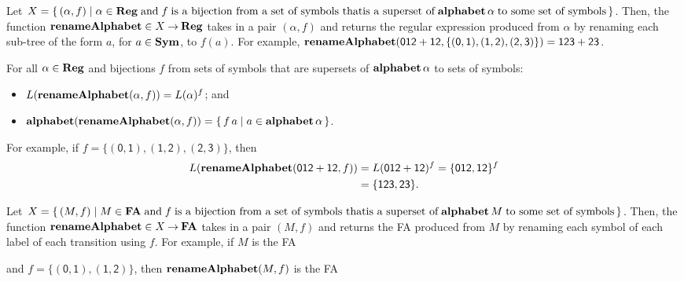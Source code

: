 Let $X=\{ \, (\alpha,f) \mid \alpha\in\mathbf{Reg}\;\allowbreak\mbox{and}\allowbreak\;f\;\allowbreak\mbox{is a
bijection from a set of symbols that}\allowbreak\allowbreak\mbox{is a superset
of}\allowbreak\;\mathbf{alphabet}\,\alpha\;\allowbreak\mbox{to some set of symbols}\allowbreak \, \}$.
Then, the function $\mathbf{renameAlphabet}\in X\mathbin{\to}\mathbf{Reg}$ takes in a pair
$(\alpha,f)$ and
%
%
%
%
returns the regular expression produced from $\alpha$ by renaming each
sub-tree of the form $a$, for $a\in\mathbf{Sym}$, to $f(a)$.
For example, $\mathbf{renameAlphabet}(\mathsf{012+12},
\mathsf{\{(0, 1), (1, 2), (2, 3)\}}) =
\mathsf{123+23}$.

\begin{theorem}
For all $\alpha\in\mathbf{Reg}$ and bijections $f$ from sets of symbols that
are supersets of $\mathbf{alphabet}\,\alpha$ to sets of symbols:
\begin{itemize}
\item $L(\mathbf{renameAlphabet}(\alpha,f)) = L(\alpha)^f$; and

\item $\mathbf{alphabet}(\mathbf{renameAlphabet}(\alpha,f)) =
\{ \, f\,a \mid a\in\mathbf{alphabet}\,\alpha \, \}$.
\end{itemize}
\end{theorem}

For example, if $f=\mathsf{\{(0, 1), (1, 2), (2, 3)\}}$, then
\begin{align*}
L(\mathbf{renameAlphabet}(\mathsf{012+12}, f)) &=
L(\mathsf{012+12})^f=\{\mathsf{012,12}\}^f \\
&= \{\mathsf{123,23}\} .
\end{align*}

Let $X=\{ \, (M,f) \mid M\in\mathbf{FA}\;\allowbreak\mbox{and}\allowbreak\;f\;\allowbreak\mbox{is a
bijection from a set of symbols that}\allowbreak\allowbreak\mbox{is a superset
of}\allowbreak\;\mathbf{alphabet}\,M\;\allowbreak\mbox{to some set of symbols}\allowbreak \, \}$.
Then, the function $\mathbf{renameAlphabet}\in X\mathbin{\to}\mathbf{FA}$ takes in a pair $(M,f)$ and
%
%
%
%
%
%
%
%
%
%
returns the FA produced from $M$ by renaming each symbol of each
label of each transition using $f$.
For example, if $M$ is the FA
\begin{center}

\end{center}
and $f=\{\mathsf{(0,1), (1,2)}\}$, then
$\mathbf{renameAlphabet}(M,f)$ is the FA
\begin{center}

\end{center}

